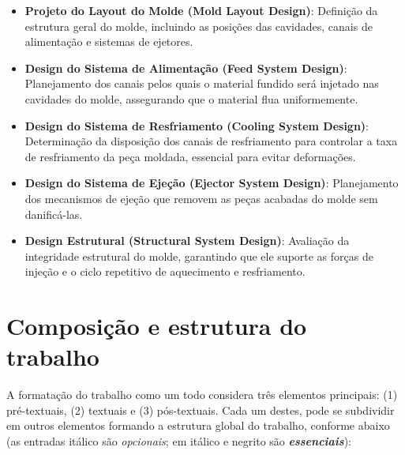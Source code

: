 \begin{itemize}
    \item \textbf{Projeto do Layout do Molde (Mold Layout Design)}: Definição da estrutura geral do molde, incluindo as posições das cavidades, canais de alimentação e sistemas de ejetores.
    
    \item \textbf{Design do Sistema de Alimentação (Feed System Design)}: Planejamento dos canais pelos quais o material fundido será injetado nas cavidades do molde, assegurando que o material flua uniformemente.
    
    \item \textbf{Design do Sistema de Resfriamento (Cooling System Design)}: Determinação da disposição dos canais de resfriamento para controlar a taxa de resfriamento da peça moldada, essencial para evitar deformações.
    
    \item \textbf{Design do Sistema de Ejeção (Ejector System Design)}: Planejamento dos mecanismos de ejeção que removem as peças acabadas do molde sem danificá-las.
    
    \item \textbf{Design Estrutural (Structural System Design)}: Avaliação da integridade estrutural do molde, garantindo que ele suporte as forças de injeção e o ciclo repetitivo de aquecimento e resfriamento.
\end{itemize}




 

\section{Composição e estrutura do trabalho}

A formatação do trabalho como um todo considera três elementos principais: 
(1) pré-textuais, (2) textuais e (3) pós-textuais. Cada um destes, pode se 
subdividir em outros elementos formando a estrutura global do trabalho, 
conforme abaixo (as entradas itálico são \textit{opcionais}; em itálico e
negrito são \textbf{\textit{essenciais}}):

